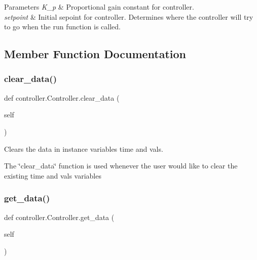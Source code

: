 \begin{DoxyParams}{Parameters}
{\em K\+\_\+p} & Proportional gain constant for controller.\\
\hline
{\em setpoint} & Initial sepoint for controller. Determines where the controller will try to go when the run function is called. \\
\hline
\end{DoxyParams}


\subsection{Member Function Documentation}
\mbox{\label{classcontroller_1_1_controller_a7e3a8cc2bca705811459c49ec7548f64}} 
\subsubsection{\texorpdfstring{clear\_data()}{clear\_data()}}
{\footnotesize\ttfamily def controller.\+Controller.\+clear\+\_\+data (\begin{DoxyParamCaption}\item[{}]{self }\end{DoxyParamCaption})}



Clears the data in instance variables time and vals. 

The \char`\"{}clear\+\_\+data\char`\"{} function is used whenever the user would like to clear the existing time and vals variables \mbox{\label{classcontroller_1_1_controller_a035f659090efe04d8db8e9ad30a4d61e}} 
\subsubsection{\texorpdfstring{get\_data()}{get\_data()}}
{\footnotesize\ttfamily def controller.\+Controller.\+get\+\_\+data (\begin{DoxyParamCaption}\item[{}]{self }\end{DoxyParamCaption})}



